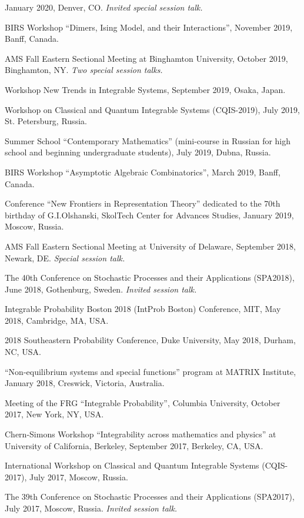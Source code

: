 \documentclass[letterpaper,11pt]{article}
\begin{document}
\begin{etaremune}
	January 2020,
	Denver, CO.
	\emph{Invited special session talk.}
	\item
		BIRS Workshop ``Dimers, Ising Model, and their Interactions'',
		November 2019, Banff, Canada.
	\item AMS Fall Eastern Sectional Meeting
	at
	Binghamton University,
	October 2019,
	Binghamton, NY.
	\emph{Two special session talks.}
	\item
		Workshop New Trends in Integrable Systems,
		September 2019, Osaka, Japan.
	\item
		Workshop on Classical and Quantum Integrable
		Systems (CQIS-2019), July 2019, St. Petersburg, Russia.
	\item
		Summer School ``Contemporary Mathematics'' (mini-course in Russian for
		high school and beginning undergraduate students),
		July 2019, Dubna, Russia.
	\item
		BIRS Workshop ``Asymptotic Algebraic Combinatorics'',
		March 2019, Banff, Canada.
	\item Conference ``New Frontiers in Representation Theory'' dedicated to the 70th birthday of G.I.Olshanski, SkolTech Center for Advances Studies, January 2019, Moscow, Russia.
\item AMS Fall Eastern Sectional Meeting
	at University of Delaware,
	September 2018, Newark, DE.
		\emph{Special session talk.}
	\item
    The 40th Conference on Stochastic Processes and their
    Applications (SPA2018), June 2018,
		Gothenburg, Sweden.
		\emph{Invited session talk.}
	\item
		Integrable Probability Boston 2018 (IntProb Boston)
		Conference,
		MIT,
		May 2018,
		Cambridge, MA, USA.
	\item
		2018 Southeastern Probability Conference,
		Duke University,
		May 2018,
		Durham, NC, USA.
	\item
		``Non-equilibrium systems and special functions'' program at MATRIX Institute,
		January 2018,
		Creswick, Victoria, Australia.
	\item
		Meeting of the
		FRG ``Integrable Probability'', Columbia University,
		October 2017, New York, NY, USA.

	\item Chern-Simons Workshop
		``Integrability across mathematics and physics''
		 at University of California, Berkeley,
			September 2017, Berkeley, CA, USA.
	\item
	      International Workshop on Classical and Quantum Integrable
	      Systems (CQIS-2017), July 2017, Moscow, Russia.
	\item
	      The 39th Conference on Stochastic Processes and their
	      Applications (SPA2017), July 2017, Moscow, Russia.
				\emph{Invited session talk.}


\end{etaremune}
\end{document}
